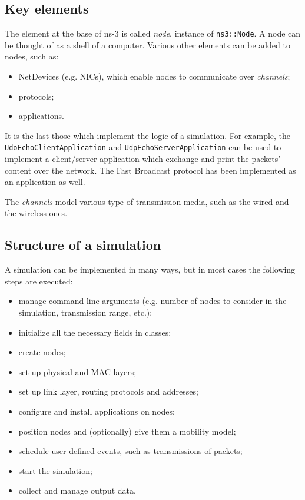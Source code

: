 		\subsection{Key elements}
			The element at the base of ns-3 is called \textit{node}, instance of \texttt{ns3::Node}. A node can be thought of as a shell of a computer. Various other elements can be added to nodes, such as:
			\begin{itemize}
				\item NetDevices (e.g. NICs), which enable nodes to communicate over \textit{channels};
				\item protocols;
				\item applications. 
			\end{itemize}
			It is the last those which implement the logic of a simulation. For example, the \texttt{UdoEchoClientApplication} and \texttt{UdpEchoServerApplication} can be used to implement a client/server application which exchange and print the packets' content over the network. The Fast Broadcast protocol has been implemented as an application as well.
			
			
			The \textit{channels} model various type of transmission media, such as the wired and the wireless ones.
			
		\subsection{Structure of a simulation}
			A simulation can be implemented in many ways, but in most cases the following steps are executed:
			\begin{itemize}
				\item manage command line arguments (e.g. number of nodes to consider in the simulation, transmission range, etc.);
				\item initialize all the necessary fields in classes;
				\item create nodes;
				\item set up physical and MAC layers;
				\item set up link layer, routing protocols and addresses;
				\item configure and install applications on nodes;
				\item position nodes and (optionally) give them a mobility model;
				\item schedule user defined events, such as transmissions of packets;
				\item start the simulation;
				\item collect and manage output data.
			\end{itemize}
		
